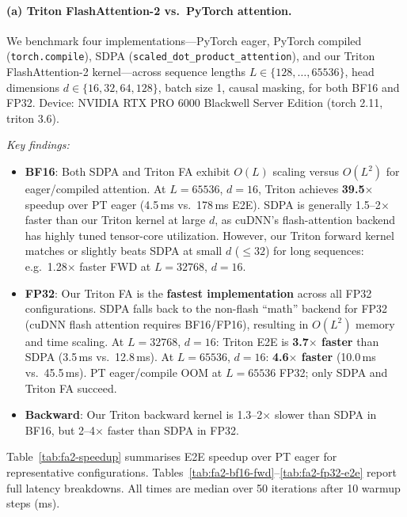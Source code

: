 \documentclass[11pt]{article}
\begin{document}
\paragraph{(a) Triton FlashAttention-2 vs.\ PyTorch attention.}

We benchmark four implementations---PyTorch eager, PyTorch compiled
(\texttt{torch.compile}), SDPA (\texttt{scaled\_dot\_product\_attention}),
and our Triton FlashAttention-2 kernel---across sequence lengths
$L \in \{128, \ldots, 65536\}$, head dimensions $d \in \{16, 32, 64, 128\}$,
batch size 1, causal masking, for both BF16 and FP32.
Device: NVIDIA RTX PRO 6000 Blackwell Server Edition (torch 2.11, triton 3.6).

\textit{Key findings:}
\begin{itemize}
  \item \textbf{BF16}: Both SDPA and Triton FA exhibit $O(L)$ scaling versus
    $O(L^2)$ for eager/compiled attention.
    At $L{=}65536$, $d{=}16$, Triton achieves \textbf{39.5$\times$}
    speedup over PT eager (4.5\,ms vs.\ 178\,ms E2E).
    SDPA is generally 1.5--2$\times$ faster than our Triton kernel at large $d$,
    as cuDNN's flash-attention backend has highly tuned tensor-core utilization.
    However, our Triton forward kernel matches or slightly beats SDPA at small
    $d$ ($\le 32$) for long sequences: e.g.\ 1.28$\times$ faster FWD at
    $L{=}32768$, $d{=}16$.
  \item \textbf{FP32}: Our Triton FA is the \textbf{fastest implementation}
    across all FP32 configurations.
    SDPA falls back to the non-flash ``math'' backend for FP32
    (cuDNN flash attention requires BF16/FP16), resulting in $O(L^2)$ memory
    and time scaling.
    At $L{=}32768$, $d{=}16$: Triton E2E is \textbf{3.7$\times$ faster}
    than SDPA (3.5\,ms vs.\ 12.8\,ms).
    At $L{=}65536$, $d{=}16$: \textbf{4.6$\times$ faster}
    (10.0\,ms vs.\ 45.5\,ms).
    PT eager/compile OOM at $L{=}65536$ FP32; only SDPA and Triton FA succeed.
  \item \textbf{Backward}: Our Triton backward kernel is 1.3--2$\times$ slower
    than SDPA in BF16, but 2--4$\times$ faster than SDPA in FP32.
\end{itemize}

Table~\ref{tab:fa2-speedup} summarises E2E speedup over PT eager for
representative configurations.
Tables~\ref{tab:fa2-bf16-fwd}--\ref{tab:fa2-fp32-e2e} report full latency
breakdowns.  All times are median over 50 iterations after 10 warmup steps (ms).
\end{document}
